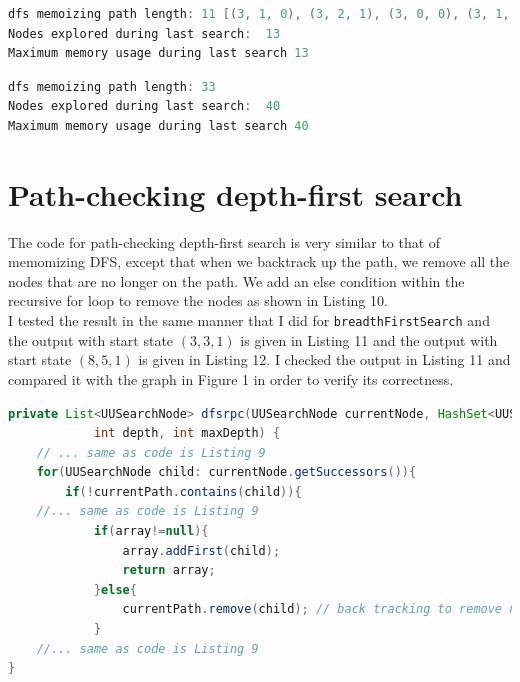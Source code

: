 \documentclass[9.5pt]{extarticle}
\begin{document}
\begin{lstlisting}[language=java,caption={Output for memomized DFS for start state of (3, 3, 1)}]
dfs memoizing path length: 11 [(3, 1, 0), (3, 2, 1), (3, 0, 0), (3, 1, 1), (1, 1, 0), (2, 2, 1), (0, 2, 0), (0, 3, 1), (0, 1, 0), (0, 2, 1), (0, 0, 0)]
Nodes explored during last search:  13
Maximum memory usage during last search 13
\end{lstlisting}

\begin{lstlisting}[language=java,caption={Output for memomized DFS for start state of (8, 5, 1)}]
dfs memoizing path length: 33 
Nodes explored during last search:  40
Maximum memory usage during last search 40
\end{lstlisting}

\section{Path-checking depth-first search}

The code for path-checking depth-first search is very similar to that of memomizing DFS, except that when we backtrack up the path, we remove all the nodes that are no longer on the path. We add an else condition within the recursive for loop to remove the nodes as shown in Listing 10.\\

I tested the result in the same manner that I did for \verb`breadthFirstSearch` and the output with start state $(3,3,1)$ is given in Listing 11 and the output with start state $(8,5,1)$ is given in Listing 12. I checked the output in Listing 11 and compared it with the graph in Figure 1 in order to verify its correctness.\\

\begin{lstlisting}[language=java,caption={Path-checking depth-first search}]
private List<UUSearchNode> dfsrpc(UUSearchNode currentNode, HashSet<UUSearchNode> currentPath,
			int depth, int maxDepth) {
	// ... same as code is Listing 9
	for(UUSearchNode child: currentNode.getSuccessors()){
		if(!currentPath.contains(child)){
	//... same as code is Listing 9
			if(array!=null){
				array.addFirst(child);
				return array;
			}else{
				currentPath.remove(child); // back tracking to remove node that is off the path
			}
	//... same as code is Listing 9
}
\end{lstlisting}
\end{document}
